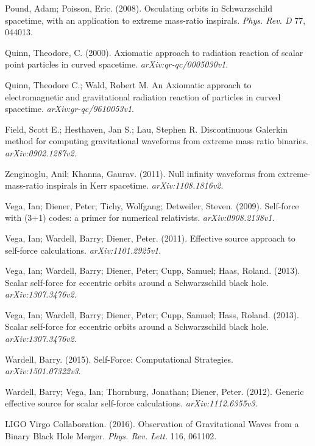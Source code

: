 Pound, Adam; Poisson, Eric. (2008). Osculating orbits in Schwarzschild spacetime, with an application to extreme mass-ratio inspirals. {\em Phys. Rev. D} 77, 044013.

Quinn, Theodore, C. (2000). Axiomatic approach to radiation reaction of scalar point particles in curved spacetime. {\em arXiv:qr-qc/0005030v1}.

Quinn, Theodore C.; Wald, Robert M. An Axiomatic approach to electromagnetic and gravitational radiation reaction of particles in curved spacetime. {\em arXiv:gr-qc/9610053v1}.

Field, Scott E.; Hesthaven, Jan S.; Lau, Stephen R. Discontinuous Galerkin method for computing gravitational waveforms from extreme mass ratio binaries. {\em arXiv:0902.1287v2}.

Zenginoglu, Anil; Khanna, Gaurav. (2011). Null infinity waveforms from extreme-mass-ratio inspirals in Kerr spacetime. {\em arXiv:1108.1816v2}.

Vega, Ian; Diener, Peter; Tichy, Wolfgang; Detweiler, Steven. (2009). Self-force with (3+1) codes: a primer for numerical relativists. {\em arXiv:0908.2138v1}.

Vega, Ian; Wardell, Barry; Diener, Peter. (2011). Effective source approach to self-force calculations. {\em arXiv:1101.2925v1}.

Vega, Ian; Wardell, Barry; Diener, Peter; Cupp, Samuel; Haas, Roland. (2013). Scalar self-force for eccentric orbits around a Schwarzschild black hole. {\em arXiv:1307.3476v2}.

Vega, Ian; Wardell, Barry; Diener, Peter; Cupp, Samuel; Hass, Roland. (2013). Scalar self-force for eccentric orbits around a Schwarzschild black hole. {\em arXiv:1307.3476v2}.

Wardell, Barry. (2015). Self-Force: Computational Strategies. {\em arXiv:1501.07322v3}.

Wardell, Barry; Vega, Ian; Thornburg, Jonathan; Diener, Peter. (2012). Generic effective source for scalar self-force calculations. {\em arXiv:1112.6355v3}.



LIGO Virgo Collaboration. (2016). Observation of Gravitational Waves from a Binary Black Hole Merger. {\em Phys. Rev. Lett.} 116, 061102.

